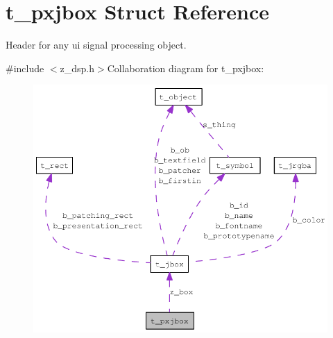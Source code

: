 \hypertarget{structt__pxjbox}{
\section{t\_\-pxjbox Struct Reference}
\label{structt__pxjbox}
}


Header for any ui signal processing object.  


{\ttfamily \#include $<$z\_\-dsp.h$>$}Collaboration diagram for t\_\-pxjbox:\nopagebreak
\begin{figure}[H]
\begin{center}
\leavevmode
\includegraphics[width=400pt]{structt__pxjbox__coll__graph}
\end{center}
\end{figure}
